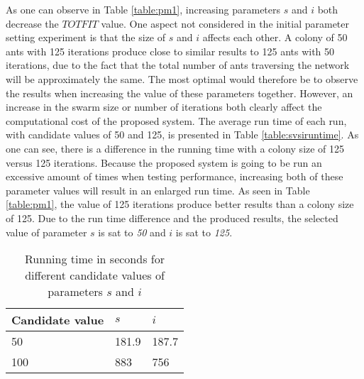 As one can observe in Table \vref{table:pm1}, increasing parameters $s$ and $i$ both decrease the $TOTFIT$ value. One aspect not considered in the initial parameter setting experiment is that the size of $s$ and $i$ affects each other. A colony of 50 ants with 125 iterations produce close to similar results to 125 ants with 50 iterations, due to the fact that the total number of ants traversing the network will be approximately the same. The most optimal would therefore be to observe the results when increasing the value of these parameters together. However, an increase in the swarm size or number of iterations both clearly affect the computational cost of the proposed system. The average run time of each run, with candidate values of 50 and 125, is presented in Table \vref{table:svsiruntime}. As one can see, there is a difference in the running time with a colony size of 125 versus 125 iterations. Because the proposed system is going to be run an excessive amount of times when testing performance, increasing both of these parameter values will result in an enlarged run time. As seen in Table \ref{table:pm1}, the value of 125 iterations produce better results than a colony size of 125. Due to the run time difference and the produced results, the selected value of parameter $s$ is sat to \textit{50} and $i$ is sat to \textit{125}.

\begin{table}[H]
    \centering
    \begin{tabular}{|l|l|l|}
    \hline
    \textbf{Candidate value} & \textbf{$s$} & \textbf{$i$}\\
    \hline
    50 & 181.9 & 187.7 \\
    100 & 883 & 756\\
    \hline
    \end{tabular}
    \caption {Running time in seconds for different candidate values of parameters $s$ and $i$}
    \label{table:svsiruntime}
    \end{table}



